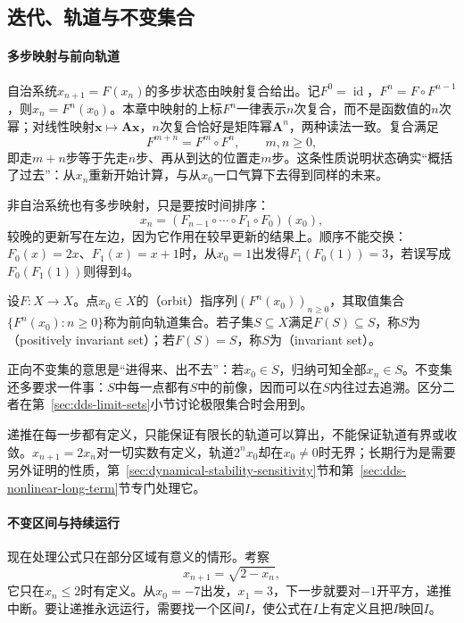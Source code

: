 \subsection{迭代、轨道与不变集合}
\label{sec:dds-orbits-invariant}

\paragraph{多步映射与前向轨道}
自治系统$x_{n+1}=F(x_n)$的多步状态由映射复合给出。记$F^0=\operatorname{id}$，$F^{n}=F\circ F^{n-1}$，则$x_n=F^n(x_0)$。本章中映射的上标$F^n$一律表示$n$次复合，而不是函数值的$n$次幂；对线性映射$\bm x\mapsto\bm A\bm x$，$n$次复合恰好是矩阵幂$\bm A^n$，两种读法一致。复合满足
\[
  F^{m+n}=F^m\circ F^n,\qquad m,n\geq0,
\]
即走$m+n$步等于先走$n$步、再从到达的位置走$m$步。这条性质说明状态确实“概括了过去”：从$x_n$重新开始计算，与从$x_0$一口气算下去得到同样的未来。

非自治系统也有多步映射，只是要按时间排序：
\[
  x_n=(F_{n-1}\circ\cdots\circ F_1\circ F_0)(x_0),
\]
较晚的更新写在左边，因为它作用在较早更新的结果上。顺序不能交换：$F_0(x)=2x$、$F_1(x)=x+1$时，从$x_0=1$出发得$F_1(F_0(1))=3$，若误写成$F_0(F_1(1))$则得到$4$。

\begin{definition}[轨道与不变集合]
\label{def:dds-orbit-invariant}
设$F:X\to X$。点$x_0\in X$的（orbit）指序列$(F^n(x_0))_{n\geq0}$，其取值集合$\{F^n(x_0):n\geq0\}$称为前向轨道集合。若子集$S\subseteq X$满足$F(S)\subseteq S$，称$S$为（positively invariant set）；若$F(S)=S$，称$S$为（invariant set）。
\end{definition}

正向不变集的意思是“进得来、出不去”：若$x_0\in S$，归纳可知全部$x_n\in S$。不变集还多要求一件事：$S$中每一点都有$S$中的前像，因而可以在$S$内往过去追溯。区分二者在第~\ref{sec:dds-limit-sets}小节讨论极限集合时会用到。

递推在每一步都有定义，只能保证有限长的轨道可以算出，不能保证轨道有界或收敛。$x_{n+1}=2x_n$对一切实数有定义，轨道$2^nx_0$却在$x_0\neq0$时无界；长期行为是需要另外证明的性质，第~\ref{sec:dynamical-stability-sensitivity}节和第~\ref{sec:dds-nonlinear-long-term}节专门处理它。

\paragraph{不变区间与持续运行}
现在处理公式只在部分区域有意义的情形。考察
\begin{equation}
  x_{n+1}=\sqrt{2-x_n},
  \label{eq:dds-sqrt-map}
\end{equation}
它只在$x_n\leq2$时有定义。从$x_0=-7$出发，$x_1=3$，下一步就要对$-1$开平方，递推中断。要让递推永远运行，需要找一个区间$I$，使公式在$I$上有定义且把$I$映回$I$。

